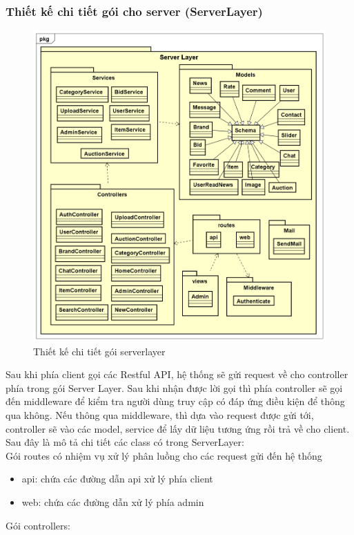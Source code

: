 \documentclass[../DoAn.tex]{subfiles}
\begin{document}
\subsubsection{Thiết kế chi tiết gói cho server (ServerLayer)}
\begin{figure}[H]
    \centering
    \includegraphics[width=0.75\linewidth,height=11.9cm]{Hinhve/ServerLayer75.png}
    \caption{Thiết kế chi tiết gói serverlayer}
    \label{fig:Fig45}
\end{figure}
Sau khi phía client gọi các Restful API, hệ thống sẽ gửi request về cho controller phía trong gói Server Layer. Sau khi nhận được lời gọi thì phía controller sẽ gọi đến middleware để kiểm tra người dùng truy cập có đáp ứng điều kiện để thông qua không. Nếu thông qua middleware, thì dựa vào request được gửi tới, controller sẽ vào các model, service để lấy dữ liệu tương ứng rồi trả về cho client.\\ 
Sau đây là mô tả chi tiết các class có trong ServerLayer:\\
Gói routes có nhiệm vụ xử lý phân luồng cho các request gửi đến hệ thống
\begin{itemize}
    \item api: chứa các đường dẫn api xử lý phía client
    \item web: chứa các đường dẫn xử lý phía admin
\end{itemize}
Gói controllers:
\end{document}
